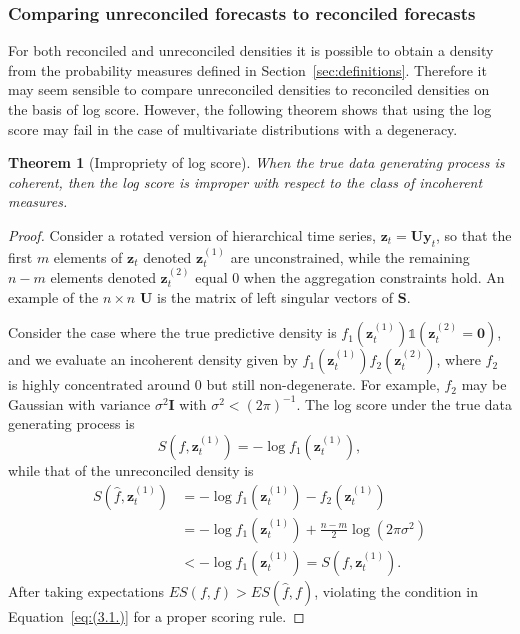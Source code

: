 \documentclass[12pt]{article}
\newtheorem{theo}{Theorem}[section]
\theoremstyle{definition}
\begin{document}
\subsubsection{Comparing unreconciled forecasts to reconciled forecasts}

For both reconciled and unreconciled densities it is possible to obtain a density from the probability measures defined in Section~\ref{sec:definitions}. Therefore it may seem sensible to compare unreconciled densities to reconciled densities on the basis of log score. However, the following theorem shows that using the log score may fail in the case of multivariate distributions with a degeneracy.

\begin{theo}[Impropriety of log score]
	When the true data generating process is coherent, then the log score is improper with respect to the class of incoherent measures.
\end{theo}

\begin{proof}
Consider a rotated version of hierarchical time series, $\bm{z}_t=\bm{U}\bm{y}_t$, so that the first $m$ elements of $\bm{z}_t$ denoted $\bm{z}^{(1)}_t$ are unconstrained, while the remaining $n-m$ elements denoted $\bm{z}^{(2)}_t$ equal $0$ when the aggregation constraints hold. An example of the $n\times n$ $\bm{U}$ is the matrix of left singular vectors of $\bm{S}$. %

Consider the case where the true predictive density is $f_1(\bm{z}^{(1)}_t)\mathbb{1}\left(\bm{z}^{(2)}_t=\bm{0}\right)$, and we evaluate an incoherent density given by $f_1(\bm{z}^{(1)}_t)f_2(\bm{z}^{(2)}_t)$, where $f_2$ is highly concentrated around $0$ but still non-degenerate. For example, $f_2$ may be Gaussian with variance $\sigma^2{\bm{I}}$ with $\sigma^2 < (2\pi)^{-1}$. The log score under the true data generating process is
\[
S\left(f,\bm{z}^{(1)}_t\right) = -\log f_1\left(\bm{z}^{(1)}_t\right),
\]
while that of the unreconciled density is
\begin{align}
S\left(\hat{f},\bm{z}^{(1)}_t\right) &= -\log f_1(\bm{z}^{(1)}_t)-f_2(\bm{z}^{(1)}_t)\\
&= -\log f_1(\bm{z}^{(1)}_t)+\frac{n-m}{2}\log(2\pi\sigma^2)\\
&<-\log f_1(\bm{z}^{(1)}_t)=S\left(f,\bm{z}^{(1)}_t\right).
\end{align}
After taking expectations $ES(f,f) > ES(\hat{f},f)$, violating the condition in Equation~\eqref{eq:(3.1.)} for a proper scoring rule.
\end{proof}
\end{document}
